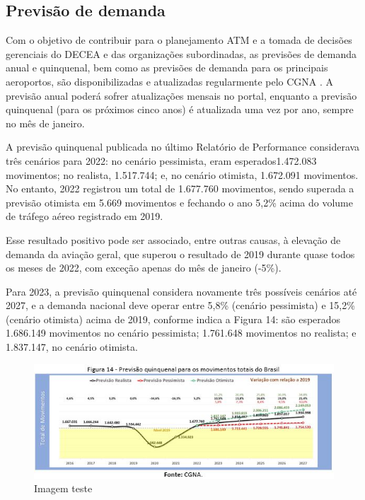 \documentclass[
]{book}
\begin{document}
\hypertarget{previsuxe3o-de-demanda}{%
\subsection{Previsão de demanda}\label{previsuxe3o-de-demanda}}

Com o objetivo de contribuir para o planejamento ATM e a tomada de decisões gerenciais do DECEA e das organizações subordinadas, as previsões de demanda anual e quinquenal, bem como as previsões de demanda para os principais aeroportos, são disponibilizadas e atualizadas regularmente pelo CGNA . A previsão anual poderá sofrer atualizações mensais no portal, enquanto a previsão quinquenal (para os próximos cinco anos) é atualizada uma vez por ano, sempre no mês de janeiro.

A previsão quinquenal publicada no último Relatório de Performance considerava três cenários para 2022: no cenário pessimista, eram esperados1.472.083 movimentos; no realista, 1.517.744; e, no cenário otimista, 1.672.091 movimentos. No entanto, 2022 registrou um total de 1.677.760 movimentos, sendo superada a previsão otimista em 5.669 movimentos e fechando o ano 5,2\% acima do volume de tráfego aéreo registrado em 2019.

Esse resultado positivo pode ser associado, entre outras causas, à elevação de demanda da aviação geral, que superou o resultado de 2019 durante quase todos os meses de 2022, com exceção apenas do mês de janeiro (-5\%).

Para 2023, a previsão quinquenal considera novamente três possíveis cenários até 2027, e a demanda nacional deve operar entre 5,8\% (cenário pessimista) e 15,2\% (cenário otimista) acima de 2019, conforme indica a Figura 14: são esperados 1.686.149 movimentos no cenário pessimista; 1.761.648 movimentos no realista; e 1.837.147, no cenário otimista.

\begin{figure}
\centering
\includegraphics{imagens/fig17.jpg}
\caption{Imagem teste}
\end{figure}
\end{document}
